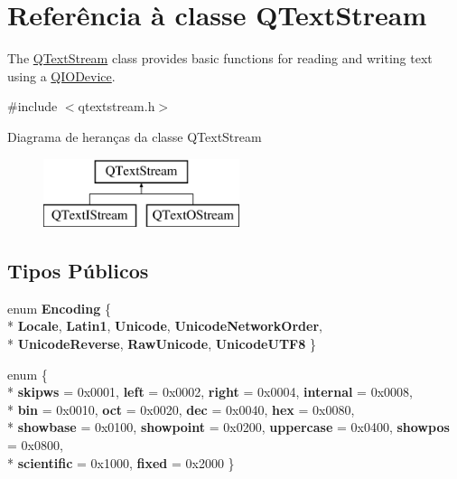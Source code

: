 \hypertarget{class_q_text_stream}{\section{Referência à classe Q\-Text\-Stream}
\label{class_q_text_stream}
}


The \hyperlink{class_q_text_stream}{Q\-Text\-Stream} class provides basic functions for reading and writing text using a \hyperlink{class_q_i_o_device}{Q\-I\-O\-Device}.  




{\ttfamily \#include $<$qtextstream.\-h$>$}

Diagrama de heranças da classe Q\-Text\-Stream\begin{figure}[H]
\begin{center}
\leavevmode
\includegraphics[height=2.000000cm]{class_q_text_stream}
\end{center}
\end{figure}
\subsection*{Tipos Públicos}
\begin{DoxyCompactItemize}
\item 
enum {\bfseries Encoding} \{ \\*
{\bfseries Locale}, 
{\bfseries Latin1}, 
{\bfseries Unicode}, 
{\bfseries Unicode\-Network\-Order}, 
\\*
{\bfseries Unicode\-Reverse}, 
{\bfseries Raw\-Unicode}, 
{\bfseries Unicode\-U\-T\-F8}
 \}
\item 
enum \{ \\*
{\bfseries skipws} = 0x0001, 
{\bfseries left} = 0x0002, 
{\bfseries right} = 0x0004, 
{\bfseries internal} = 0x0008, 
\\*
{\bfseries bin} = 0x0010, 
{\bfseries oct} = 0x0020, 
{\bfseries dec} = 0x0040, 
{\bfseries hex} = 0x0080, 
\\*
{\bfseries showbase} = 0x0100, 
{\bfseries showpoint} = 0x0200, 
{\bfseries uppercase} = 0x0400, 
{\bfseries showpos} = 0x0800, 
\\*
{\bfseries scientific} = 0x1000, 
{\bfseries fixed} = 0x2000
 \}
\end{DoxyCompactItemize}
